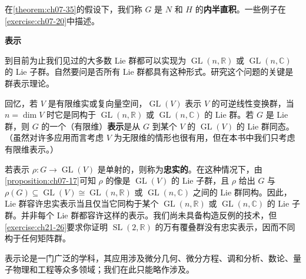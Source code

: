 \documentclass[../../main.tex]{subfiles}
\begin{document}
在\cref{theorem:ch07-35}的假设下，我们称 $G$ 是 $N$ 和 $H$ 的\textbf{内半直积}。一些例子在\cref{exercise:ch07-20}中描述。

\textbf{表示}

到目前为止我们见过的大多数 Lie 群都可以实现为 $\operatorname{GL}(n,\mathbb{R})$ 或 $\operatorname{GL}(n,\mathbb{C})$ 的 Lie 子群。自然要问是否所有 Lie 群都具有这种形式。研究这个问题的关键是群表示理论。

回忆，若 $V$ 是有限维实或复向量空间，$\operatorname{GL}(V)$ 表示 $V$ 的可逆线性变换群，当 $n=\dim V$ 时它是同构于 $\operatorname{GL}(n,\mathbb{R})$ 或 $\operatorname{GL}(n,\mathbb{C})$ 的 Lie 群。若 $G$ 是 Lie 群，则 $G$ 的一个（有限维）\textbf{表示}是从 $G$ 到某个 $V$ 的 $\operatorname{GL}(V)$ 的 Lie 群同态。（虽然对许多应用而言考虑 $V$ 为无限维的情形也很有用，但在本书中我们只考虑有限维表示。）

若表示 $\rho\colon G\to\operatorname{GL}(V)$ 是单射的，则称为\textbf{忠实的}。在这种情况下，由\cref{proposition:ch07-17}可知 $\rho$ 的像是 $\operatorname{GL}(V)$ 的 Lie 子群，且 $\rho$ 给出 $G$ 与 $\rho(G)\subseteq\operatorname{GL}(V)\cong\operatorname{GL}(n,\mathbb{R})$ 或 $\operatorname{GL}(n,\mathbb{C})$ 之间的 Lie 群同构。因此，Lie 群容许忠实表示当且仅当它同构于某个 $\operatorname{GL}(n,\mathbb{R})$ 或 $\operatorname{GL}(n,\mathbb{C})$ 的 Lie 子群。并非每个 Lie 群都容许这样的表示。我们尚未具备构造反例的技术，但\cref{exercise:ch21-26}要求你证明 $\operatorname{SL}(2,\mathbb{R})$ 的万有覆叠群没有忠实表示，因而不同构于任何矩阵群。

表示论是一门广泛的学科，其应用涉及微分几何、微分方程、调和分析、数论、量子物理和工程等众多领域；我们在此只能略作涉及。
\end{document}
